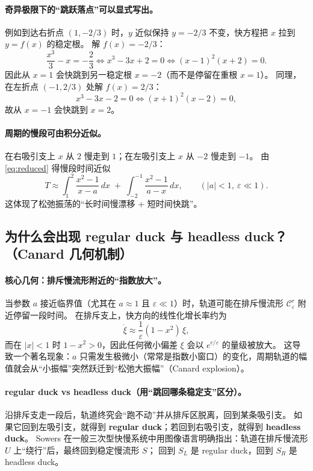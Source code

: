 \paragraph{奇异极限下的“跳跃落点”可以显式写出。}
例如到达右折点 $(1,-2/3)$ 时，$y$ 近似保持 $y=-2/3$ 不变，快方程把 $x$ 拉到 $y=f(x)$ 的稳定根。
解 $f(x)=-2/3$：
\[
\frac{x^3}{3}-x=-\frac{2}{3}
\iff x^3-3x+2=0
\iff (x-1)^2(x+2)=0.
\]
因此从 $x=1$ 会快跳到另一稳定根 $x=-2$（而不是停留在重根 $x=1$）。
同理，在左折点 $(-1,2/3)$ 处解 $f(x)=2/3$：
\[
x^3-3x-2=0 \iff (x+1)^2(x-2)=0,
\]
故从 $x=-1$ 会快跳到 $x=2$。

\paragraph{周期的慢段可由积分近似。}
在右吸引支上 $x$ 从 $2$ 慢走到 $1$；在左吸引支上 $x$ 从 $-2$ 慢走到 $-1$。
由 \eqref{eq:reduced} 得慢段时间近似
\begin{equation}\label{eq:period}
	T \approx \int_{1}^{2}\frac{x^2-1}{x-a}\,dx \;+\; \int_{-2}^{-1}\frac{x^2-1}{a-x}\,dx,
	\qquad (|a|<1,\ \varepsilon\ll1).
\end{equation}
这体现了松弛振荡的“长时间慢漂移 + 短时间快跳”。

\subsection{为什么会出现 regular duck 与 headless duck？（Canard 几何机制）}

\paragraph{核心几何：排斥慢流形附近的“指数放大”。}
当参数 $a$ 接近临界值（尤其在 $a\approx 1$ 且 $\varepsilon\ll1$）时，轨道可能在排斥慢流形 $\mathcal C_\varepsilon^{r}$ 附近停留一段时间。
在排斥支上，快方向的线性化增长率约为
\[
\dot \xi \approx \frac{1}{\varepsilon}(1-x^2)\,\xi,
\]
而在 $|x|<1$ 时 $1-x^2>0$，因此任何微小偏差 $\xi$ 会以 $e^{c/\varepsilon}$ 的量级被放大。
这导致一个著名现象：$a$ 只需发生极微小（常常是指数小窗口）的变化，周期轨道的幅值就会从“小振幅”突然跃迁到“松弛大振幅”（Canard explosion）。

\paragraph{regular duck vs headless duck（用“跳回哪条稳定支”区分）。}
沿排斥支走一段后，轨道终究会“跑不动”并从排斥区脱离，回到某条吸引支。
如果它回到左吸引支，就得到 \textbf{regular duck}；若回到右吸引支，就得到 \textbf{headless duck}。
Sowers 在一般三次型快慢系统中用图像语言明确指出：轨道在排斥慢流形 $U$ 上“绕行”后，最终回到稳定慢流形 $S$；
回到 $S_L$ 是 regular duck，回到 $S_R$ 是 headless duck。%


